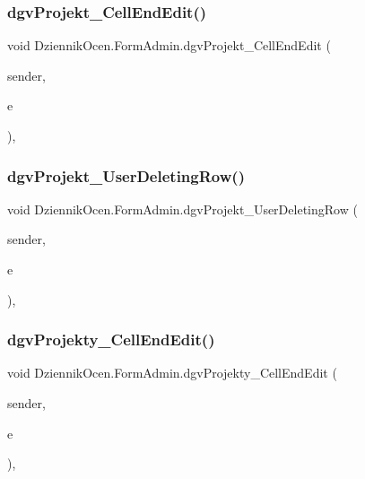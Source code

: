 \subsubsection{\texorpdfstring{dgv\+Projekt\+\_\+\+Cell\+End\+Edit()}{dgvProjekt\_CellEndEdit()}}
{\footnotesize\ttfamily void Dziennik\+Ocen.\+Form\+Admin.\+dgv\+Projekt\+\_\+\+Cell\+End\+Edit (\begin{DoxyParamCaption}\item[{object}]{sender,  }\item[{Data\+Grid\+View\+Cell\+Event\+Args}]{e }\end{DoxyParamCaption})\hspace{0.3cm}{\ttfamily [inline]}, {\ttfamily [private]}}

\mbox{\label{class_dziennik_ocen_1_1_form_admin_ad25ef9fe40bb0f7d995b07c10e053c3d}} 
\subsubsection{\texorpdfstring{dgv\+Projekt\+\_\+\+User\+Deleting\+Row()}{dgvProjekt\_UserDeletingRow()}}
{\footnotesize\ttfamily void Dziennik\+Ocen.\+Form\+Admin.\+dgv\+Projekt\+\_\+\+User\+Deleting\+Row (\begin{DoxyParamCaption}\item[{object}]{sender,  }\item[{Data\+Grid\+View\+Row\+Cancel\+Event\+Args}]{e }\end{DoxyParamCaption})\hspace{0.3cm}{\ttfamily [inline]}, {\ttfamily [private]}}

\mbox{\label{class_dziennik_ocen_1_1_form_admin_a8041f9fec5afec151944bd5eeb7897c8}} 
\subsubsection{\texorpdfstring{dgv\+Projekty\+\_\+\+Cell\+End\+Edit()}{dgvProjekty\_CellEndEdit()}}
{\footnotesize\ttfamily void Dziennik\+Ocen.\+Form\+Admin.\+dgv\+Projekty\+\_\+\+Cell\+End\+Edit (\begin{DoxyParamCaption}\item[{object}]{sender,  }\item[{Data\+Grid\+View\+Cell\+Event\+Args}]{e }\end{DoxyParamCaption})\hspace{0.3cm}{\ttfamily [inline]}, {\ttfamily [private]}}

